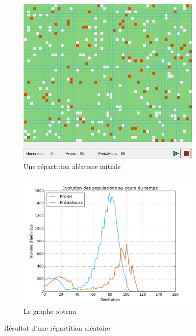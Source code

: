 \documentclass[11pt]{article}
\begin{document}
\begin{figure}[!ht]
    \begin{subfigure}{0.49\textwidth}
        \includegraphics[width=\linewidth]{repart_aleatoire2.png} 
        \caption{Une répartition aléatoire initiale}
    \end{subfigure}
    \begin{subfigure}{0.49\textwidth}
        \includegraphics[width=\linewidth]{repart_aleat_resultat1.png}
        \caption{Le graphe obtenu}
    \end{subfigure}
     
    \caption{Résultat d'une répartition aléatoire}
    \label{fig:aleatoire}
\end{figure}
\end{document}

